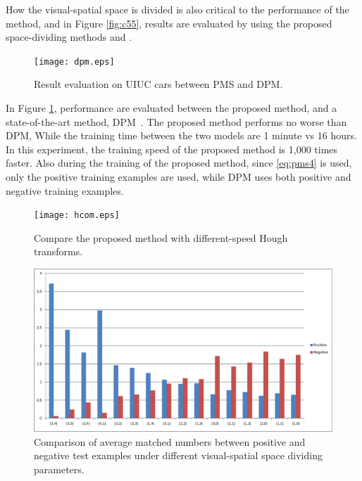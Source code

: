 How the visual-spatial space is divided is also critical to the performance of the method, and in Figure \ref{fig:c55}, results are evaluated by using the proposed space-dividing methods and \citep{pmk}.


\begin{figure}[!htbp]
\centering

\texttt{[image: dpm.eps]}


\caption[Result comparison with deformable part model~\citep{ac31}]{Result evaluation on UIUC cars between PMS and DPM.}
\label{fig:c56}
\end{figure}
\FloatBarrier


In Figure \ref{fig:c56}, performance are evaluated between the proposed method, and a state-of-the-art method, DPM~\citep{ac31}. The proposed method performs no worse than DPM,
While the training time between the two models are 1 minute vs 16 hours. In this experiment, the training speed of the proposed method is 1,000 times faster. Also during the training of the proposed method, since \ref{eq:pms4} is used, only the positive training examples are used, while DPM uses both positive and negative training examples.

\begin{figure}[!htbp]
\centering

\texttt{[image: hcom.eps]}


\caption[Comparison between Pyramid Match Score and Hough transform]{Compare the proposed method with different-speed Hough transforms.}
\label{fig:c5i}
\end{figure}
\FloatBarrier


\begin{figure}[!htbp]
\centering

\includegraphics[width=1\textwidth]{ancp.eps}


\caption[Average numbers of matched pairs of positive and negative test examples]{Comparison of average matched numbers between positive and negative test examples under different visual-spatial space dividing parameters.}
\label{fig:c57}
\end{figure}
\FloatBarrier

